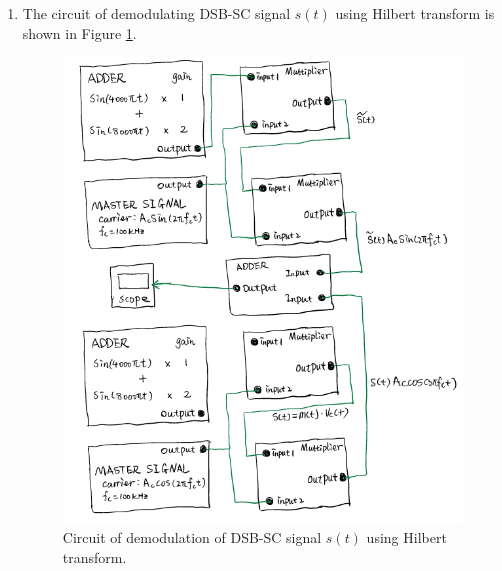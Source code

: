 \documentclass[11pt]{article}
\begin{document}
\begin{enumerate}[label=(\alph*)]
\item %
The circuit of demodulating DSB-SC signal $s(t)$ using Hilbert transform is shown in Figure \ref{fig:3ecircuit}.
\begin{figure}[H]
    \centering
    \includegraphics[scale=0.7]{3ecircuit.PNG}
    \caption{\label{fig:3ecircuit}Circuit of demodulation of DSB-SC signal $s(t)$ using Hilbert transform.}
\end{figure}


\end{enumerate}
\end{document}
